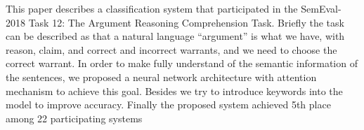 This paper describes a classification system that participated in the SemEval-2018 Task 12: The Argument Reasoning Comprehension Task. Briefly the task can be described as that a natural language ``argument'' is what we have, with reason, claim, and correct and incorrect warrants, and we need to choose the correct warrant. In order to make fully understand of the semantic information of the sentences, we proposed a neural network architecture with attention mechanism to achieve this goal. Besides we try to introduce keywords into the model to improve accuracy. Finally the proposed system achieved 5th place among 22 participating systems
